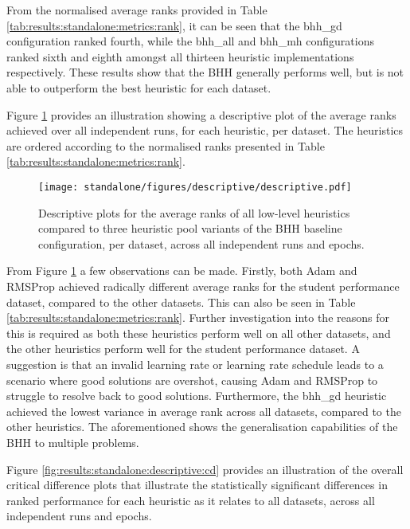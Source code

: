 From the normalised average ranks provided in Table \ref{tab:results:standalone:metrics:rank}, it can be seen that the bhh\_gd configuration ranked fourth, while the bhh\_all and bhh\_mh configurations ranked sixth and eighth amongst all thirteen heuristic implementations respectively. These results show that the \acs{BHH} generally performs well, but is not able to outperform the best heuristic for each dataset.

Figure \ref{fig:results:standalone:descriptive:descriptive} provides an illustration showing a descriptive plot of the average ranks achieved over all independent runs, for each heuristic, per dataset. The heuristics are ordered according to the normalised ranks presented in Table \ref{tab:results:standalone:metrics:rank}.

\begin{figure}[htb]
	\centering
	\texttt{[image: standalone/figures/descriptive/descriptive.pdf]}
	\caption{Descriptive plots for the average ranks of all low-level heuristics compared to three heuristic pool variants of the \acs{BHH} baseline configuration, per dataset, across all independent runs and epochs.}
	\label{fig:results:standalone:descriptive:descriptive}
\end{figure}

From Figure \ref{fig:results:standalone:descriptive:descriptive} a few observations can be made. Firstly, both \acs{Adam} and \acs{RMSProp} achieved radically different average ranks for the student performance dataset, compared to the other datasets. This can also be seen in Table \ref{tab:results:standalone:metrics:rank}. Further investigation into the reasons for this is required as both these heuristics perform well on all other datasets, and the other heuristics perform well for the student performance dataset. A suggestion is that an invalid learning rate or learning rate schedule leads to a scenario where good solutions are overshot, causing \acs{Adam} and \acs{RMSProp} to struggle to resolve back to good solutions. Furthermore, the bhh\_gd heuristic achieved the lowest variance in average rank across all datasets, compared to the other heuristics. The aforementioned shows the generalisation capabilities of the \acs{BHH} to multiple problems.

Figure \ref{fig:results:standalone:descriptive:cd} provides an illustration of the overall critical difference plots that illustrate the statistically significant differences in ranked performance for each heuristic as it relates to all datasets, across all independent runs and epochs.

